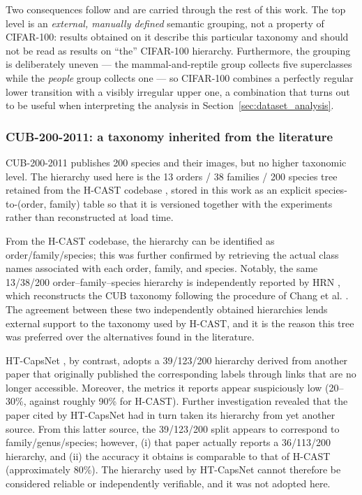 Two consequences follow and are carried through the rest of this work. The top level is an \emph{external, manually defined} semantic grouping, not a property of CIFAR-100: results obtained on it describe this particular taxonomy and should not be read as results on ``the'' CIFAR-100 hierarchy. Furthermore, the grouping is deliberately uneven --- the mammal-and-reptile group collects five superclasses while the \emph{people} group collects one --- so CIFAR-100 combines a perfectly regular lower transition with a visibly irregular upper one, a combination that turns out to be useful when interpreting the analysis in Section~\ref{sec:dataset_analysis}.

\subsubsection{CUB-200-2011: a taxonomy inherited from the literature}

CUB-200-2011 \cite{wah2011caltech} publishes 200 species and their images, but no higher taxonomic level. The hierarchy used here is the 13 orders / 38 families / 200 species tree retained from the H-CAST codebase \cite{park2024visually}, stored in this work as an explicit species-to-(order, family) table so that it is versioned together with the experiments rather than reconstructed at load time.

From the H-CAST codebase, the hierarchy can be identified as order/family/species; this was further confirmed by retrieving the actual class names associated with each order, family, and species. Notably, the same 13/38/200 order--family--species hierarchy is independently reported by HRN \cite{chen2022label}, which reconstructs the CUB taxonomy following the procedure of Chang et al. \cite{chang2021flamingo}. The agreement between these two independently obtained hierarchies lends external support to the taxonomy used by H-CAST, and it is the reason this tree was preferred over the alternatives found in the literature.

HT-CapsNet \cite{noor2025taxonomy}, by contrast, adopts a 39/123/200 hierarchy derived from another paper that originally published the corresponding labels through links that are no longer accessible. Moreover, the metrics it reports appear suspiciously low (20--30\%, against roughly 90\% for H-CAST). Further investigation revealed that the paper cited by HT-CapsNet had in turn taken its hierarchy from yet another source. From this latter source, the 39/123/200 split appears to correspond to family/genus/species; however, (i) that paper actually reports a 36/113/200 hierarchy, and (ii) the accuracy it obtains is comparable to that of H-CAST (approximately 80\%). The hierarchy used by HT-CapsNet cannot therefore be considered reliable or independently verifiable, and it was not adopted here.

